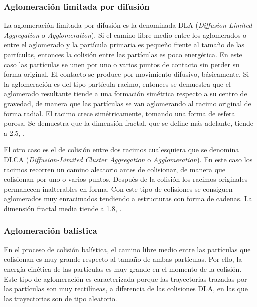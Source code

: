 \subsubsection{Aglomeración limitada por difusión} \label{subsub:Aglomeracionlimitadadifusion}

\par La aglomeración limitada por difusión es la denominada DLA (\textit{Diffusion-Limited Aggregation} o \textit{Agglomeration}). Si el camino libre medio entre los aglomerados o entre el aglomerado y la partícula primaria es pequeño frente al tamaño de las partículas, entonces la colisión entre las partículas es poco energética. En este caso las partículas se unen por uno o varios puntos de contacto sin perder su forma original. El contacto se produce por movimiento difusivo, básicamente. Si la aglomeración es del tipo partícula-racimo, entonces se demuestra que el aglomerado resultante tiende a una formación simétrica respecto a su centro de gravedad, de manera que las partículas se van aglomerando al racimo original de forma radial. El racimo crece simétricamente, tomando una forma de esfera porosa. Se demuestra que la dimensión fractal, que se define más adelante, tiende a 2.5, \cite{friedlander:2000}. 

\par El otro caso es el de colisión entre dos racimos cualesquiera que se denomina DLCA (\textit{Diffusion-Limited Cluster Aggregation} o \textit{Agglomeration}). En este caso los racimos recorren un camino aleatorio antes de colisionar, de manera que colisionan por uno o varios puntos. Después de la colisión los racimos originales permanecen inalterables en forma. Con este tipo de colisiones se consiguen aglomerados muy enracimados tendiendo a estructuras con forma de cadenas. La dimensión fractal media tiende a 1.8, \cite{megaridisetal:1990}.

\subsubsection{Aglomeración balística}

\par En el proceso de colisión balística, el camino libre medio entre las partículas que colisionan es muy grande respecto al tamaño de ambas partículas. Por ello, la energía cinética de las partículas es muy grande en el momento de la colisión. Este tipo de aglomeración es caracterizada porque las trayectorias trazadas por las partículas son muy rectilíneas, a diferencia de las colisiones DLA, en las que las trayectorias son de tipo aleatorio.

